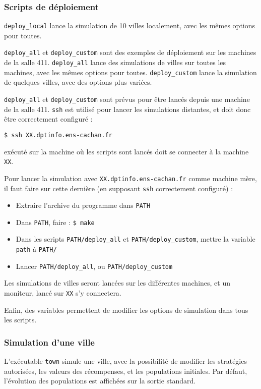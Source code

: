 \documentclass[draft,10pt]{article}
\begin{document}
\subsubsection{Scripts de déploiement}
\verb|deploy_local| lance la simulation de 10 villes localement, avec les mêmes options pour toutes.

\verb|deploy_all| et \verb|deploy_custom| sont des exemples de déploiement sur les machines de la salle 411.
\verb|deploy_all| lance des simulations de villes sur toutes les machines, avec les mêmes options pour toutes.
\verb|deploy_custom| lance la simulation de quelques villes, avec des options plus variées.

\verb|deploy_all| et \verb|deploy_custom| sont prévus pour être lancés depuis une machine de la salle 411.
\verb|ssh| est utilisé pour lancer les simulations distantes, et doit donc être correctement configuré :
\begin{verbatim}
$ ssh XX.dptinfo.ens-cachan.fr
\end{verbatim}
exécuté sur la machine où les scripts sont lancés doit se connecter à la machine \verb|XX|.

Pour lancer la simulation avec \verb|XX.dptinfo.ens-cachan.fr| comme machine mère, il faut faire
sur cette dernière (en supposant \verb|ssh| correctement configuré) :
\begin{itemize}
\item Extraire l'archive du programme dans \verb|PATH|
\item Dans \verb|PATH|, faire : \verb|$ make|
\item Dans les scripts \verb|PATH/deploy_all| et \verb|PATH/deploy_custom|, mettre la variable \verb|path| à \verb|PATH/|
\item Lancer \verb|PATH/deploy_all|, ou \verb|PATH/deploy_custom|
\end{itemize}

Les simulations de villes seront lancées sur les différentes machines, et un moniteur, lancé sur \verb|XX| s'y connectera.

Enfin, des variables permettent de modifier les options de simulation dans tous les scripts.


\subsubsection{Simulation d'une ville}
L'exécutable \verb|town| simule une ville, avec la possibilité de modifier les stratégies autorisées,
les valeurs des récompenses, et les populations initiales. Par défaut, l'évolution des populations
est affichées sur la sortie standard.
\end{document}
